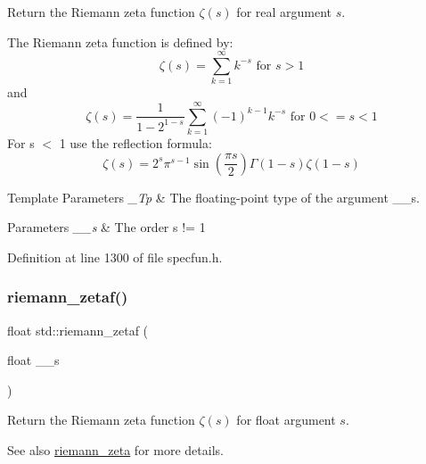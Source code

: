 Return the Riemann zeta function $ \zeta(s) $ for real argument $ s $.

The Riemann zeta function is defined by\+: \[ \zeta(s) = \sum_{k=1}^{\infty} k^{-s} \mbox{ for } s > 1 \] and \[ \zeta(s) = \frac{1}{1-2^{1-s}}\sum_{k=1}^{\infty}(-1)^{k-1}k^{-s} \mbox{ for } 0 <= s < 1 \] For s $<$ 1 use the reflection formula\+: \[ \zeta(s) = 2^s \pi^{s-1} \sin(\frac{\pi s}{2}) \Gamma(1-s) \zeta(1-s) \]


\begin{DoxyTemplParams}{Template Parameters}
{\em \+\_\+\+Tp} & The floating-\/point type of the argument {\ttfamily \+\_\+\+\_\+s}. \\
\hline
\end{DoxyTemplParams}

\begin{DoxyParams}{Parameters}
{\em \+\_\+\+\_\+s} & The order {\ttfamily  s != 1 } \\
\hline
\end{DoxyParams}


Definition at line 1300 of file specfun.\+h.

\mbox{\label{group__cxx17__math__spec__func_gaf92063315061a56d3e2c4053156d968e}} 
\subsubsection{\texorpdfstring{riemann\+\_\+zetaf()}{riemann\_zetaf()}}
{\footnotesize\ttfamily float std\+::riemann\+\_\+zetaf (\begin{DoxyParamCaption}\item[{float}]{\+\_\+\+\_\+s }\end{DoxyParamCaption})\hspace{0.3cm}{\ttfamily [inline]}}

Return the Riemann zeta function $ \zeta(s) $ for {\ttfamily float} argument $ s $.

\begin{DoxySeeAlso}{See also}
\hyperlink{group__cxx17__math__spec__func_gac4ef9d52ee583c77937c3a420b7c72ca}{riemann\+\_\+zeta} for more details. 
\end{DoxySeeAlso}


